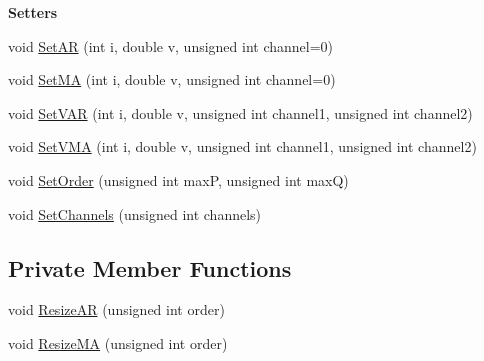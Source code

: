 \begin{Indent}\textbf{ Setters}\par
\begin{DoxyCompactItemize}
\item 
void \hyperlink{classtsa_1_1_a_r_m_a_view_ae1b0323b27d5c8ad4a9e43a0119c407a}{Set\+AR} (int i, double v, unsigned int channel=0)
\item 
void \hyperlink{classtsa_1_1_a_r_m_a_view_a0fb548001ea80ac198ecf5619090320e}{Set\+MA} (int i, double v, unsigned int channel=0)
\item 
void \hyperlink{classtsa_1_1_a_r_m_a_view_a75a22d6966763cdba5788303a3fe3e7a}{Set\+V\+AR} (int i, double v, unsigned int channel1, unsigned int channel2)
\item 
void \hyperlink{classtsa_1_1_a_r_m_a_view_a3cebaae08e5718c57fb234c414904bc6}{Set\+V\+MA} (int i, double v, unsigned int channel1, unsigned int channel2)
\item 
void \hyperlink{classtsa_1_1_a_r_m_a_view_a192fe1e105780bc26cae74f51bc54597}{Set\+Order} (unsigned int maxP, unsigned int maxQ)
\item 
void \hyperlink{classtsa_1_1_a_r_m_a_view_a14f528f407a13473a7c20a0d7dec6482}{Set\+Channels} (unsigned int channels)
\end{DoxyCompactItemize}
\end{Indent}
\subsection*{Private Member Functions}
\begin{DoxyCompactItemize}
\item 
void \hyperlink{classtsa_1_1_a_r_m_a_view_a9fdd9c921d39b10a4d83379f69bdb160}{Resize\+AR} (unsigned int order)
\item 
void \hyperlink{classtsa_1_1_a_r_m_a_view_a757cddd07c0bb5bf0c4a8784e79f5900}{Resize\+MA} (unsigned int order)
\end{DoxyCompactItemize}
